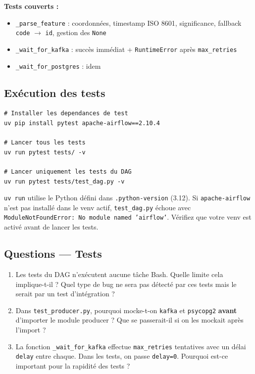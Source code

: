 \documentclass[12pt,a4paper]{article}
\begin{document}
\textbf{Tests couverts :}
\begin{itemize}
  \item \texttt{\_parse\_feature} : coordonnées, timestamp ISO 8601, significance,
        fallback \texttt{code} $\to$ \texttt{id}, gestion des \texttt{None}
  \item \texttt{\_wait\_for\_kafka} : succès immédiat + \texttt{RuntimeError} après \texttt{max\_retries}
  \item \texttt{\_wait\_for\_postgres} : idem
\end{itemize}

\subsection{Exécution des tests}

\begin{lstlisting}[style=bash, caption={Lancement des tests avec uv}]
# Installer les dependances de test
uv pip install pytest apache-airflow==2.10.4

# Lancer tous les tests
uv run pytest tests/ -v

# Lancer uniquement les tests du DAG
uv run pytest tests/test_dag.py -v
\end{lstlisting}

\begin{warningbox}
  \texttt{uv run} utilise le Python défini dans \texttt{.python-version} (3.12).
  Si \texttt{apache-airflow} n'est pas installé dans le venv actif,
  \texttt{test\_dag.py} échoue avec \texttt{ModuleNotFoundError: No module named 'airflow'}.
  Vérifiez que votre venv est activé avant de lancer les tests.
\end{warningbox}

\subsection*{Questions --- Tests}

\begin{enumerate}[label=\textbf{Q\arabic*.}]
  \item Les tests du DAG n'exécutent aucune tâche Bash.
        Quelle limite cela implique-t-il ? Quel type de bug ne sera pas détecté
        par ces tests mais le serait par un test d'intégration ?
  \item Dans \texttt{test\_producer.py}, pourquoi mocke-t-on \texttt{kafka} et \texttt{psycopg2}
        \textbf{avant} d'importer le module producer ?
        Que se passerait-il si on les mockait après l'import ?
  \item La fonction \texttt{\_wait\_for\_kafka} effectue \texttt{max\_retries} tentatives
        avec un délai \texttt{delay} entre chaque. Dans les tests, on passe \texttt{delay=0}.
        Pourquoi est-ce important pour la rapidité des tests ?
\end{enumerate}
\end{document}
